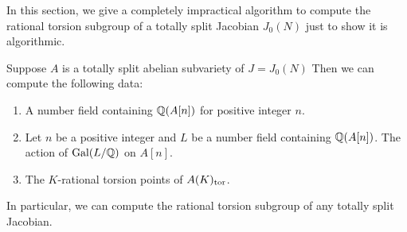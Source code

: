 In this section, we give a completely impractical algorithm to compute the
rational torsion subgroup of a totally split Jacobian $J_0(N)$ just to show it
is algorithmic.
\begin{proposition}
    Suppose $A$ is a totally split abelian subvariety of $J=J_0(N)$ Then we can
    compute the following data:
    \begin{enumerate}
        \item
            A number field containing $\mathbb{Q}(A[n])$ for positive integer $n$.
        \item
            Let $n$ be a positive integer and $L$ be a number field containing
            $\mathbb{Q}(A[n])$. The action of $\operatorname{Gal}(L/\mathbb{Q})$ on $A[n]$.
        \item
            The $K$-rational torsion points of $A(K)_{\mathrm{tor}}$.
    \end{enumerate}
    In particular, we can compute the rational torsion subgroup of any totally
    split Jacobian.
\end{proposition}
